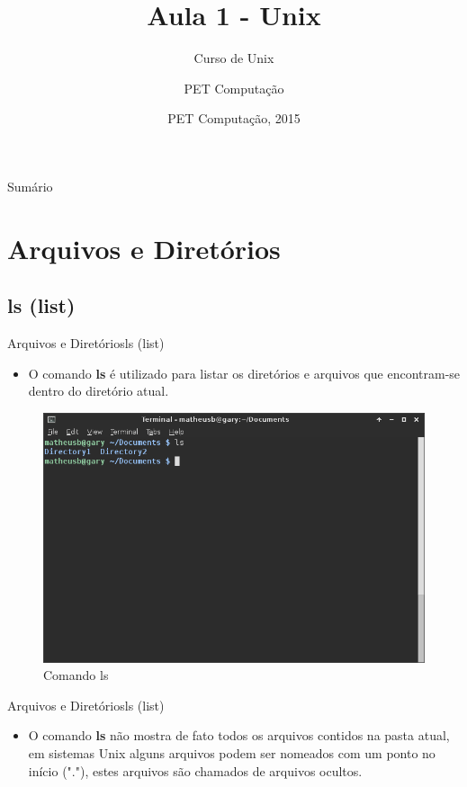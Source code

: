 \documentclass{beamer}
\title{Aula 1 - Unix}
\subtitle{Curso de Unix}
\author{PET Computa\c{c}ão}
\institute[UFSC] %
{
%
  Departamento de Informática e Estatística\\
  Universidade de Santa Catarina}
\date{PET Computa\c{c}ão, 2015}
\begin{document}
\begin{frame}
  \titlepage
\end{frame}

\begin{frame}{Sumário}
  \tableofcontents
\end{frame}

\section{Arquivos e Diretórios}

\subsection{ls (list)}

\begin{frame}{Arquivos e Diretórios}{ls (list)}
  \begin{itemize}
  \item {
   O comando \textbf{ls} é utilizado para listar os diretórios e arquivos que encontram-se dentro do diretório atual.
  }
 \end{itemize}
  \begin{figure}[h!]
        \centering
        \includegraphics[scale=0.30]{ls1.png}
        \caption{Comando ls}
        \label{fig:Comando ls}
    \end{figure}
\end{frame}

\begin{frame}{Arquivos e Diretórios}{ls (list)}
  \begin{itemize}
  \item {
   O comando \textbf{ls} não mostra de fato todos os arquivos contidos na pasta atual, em sistemas Unix alguns arquivos podem ser nomeados com um ponto no início ("."), estes arquivos são chamados de arquivos ocultos. 
  }
 \end{itemize}
 \end{frame}
 
\end{document}
